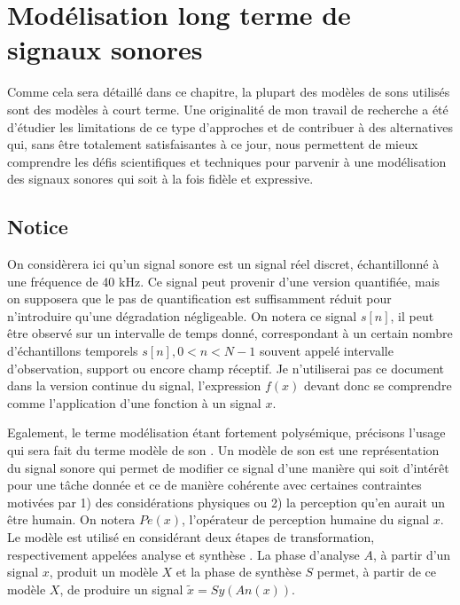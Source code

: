 \chapter{\nmu Modélisation long terme de signaux sonores} \label{chap:modeles}

Comme cela sera détaillé dans ce chapitre, la plupart des modèles de sons utilisés sont des modèles à court terme. Une originalité de mon travail de recherche a été d'étudier les limitations de ce type d'approches et de contribuer à des alternatives qui, sans être totalement satisfaisantes à ce jour, nous permettent de mieux comprendre les défis scientifiques et techniques pour parvenir à une modélisation des signaux sonores qui soit à la fois fidèle et expressive.

\section{ \nmu Notice}

On considèrera ici qu'un signal sonore est un signal réel discret, échantillonné à une fréquence de 40 kHz. Ce signal peut provenir d'une version quantifiée, mais on supposera que le pas de quantification est suffisamment réduit pour n'introduire qu'une dégradation négligeable. On notera ce signal $s[n]$, il peut être observé sur un intervalle de temps donné, correspondant à un certain nombre d'échantillons temporels $s[n], 0<n<N-1$ souvent appelé intervalle d'observation, support ou encore champ réceptif. Je n'utiliserai pas ce document dans la version continue du signal, l'expression $f(x)$ devant donc se comprendre comme l'application d'une fonction à un signal $x$.

Egalement, le terme modélisation étant fortement polysémique, précisons l'usage qui sera fait du terme \og modèle de son \fg. Un modèle de son est une représentation du signal sonore qui permet de modifier ce signal d'une manière qui soit d'intérêt pour une tâche donnée et ce de manière cohérente avec certaines contraintes motivées par 1) des considérations physiques ou 2) la perception qu'en aurait un être humain. On notera $Pe(x)$, l'opérateur de perception humaine du signal $x$.  Le modèle est utilisé en considérant deux étapes de transformation, respectivement appelées \og analyse \fg et \og synthèse \fg. La phase d'analyse $A$, à partir d'un signal $x$, produit un modèle $X$ et la phase de synthèse $S$ permet, à partir de ce modèle $X$, de produire un signal $\tilde{x}=Sy(An(x))$.

